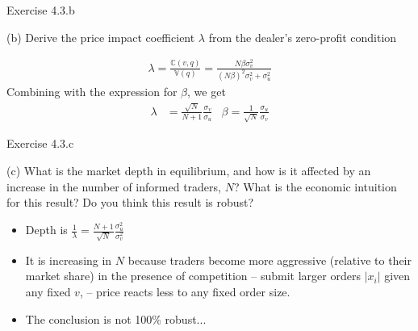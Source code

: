\documentclass[english,10pt
,handout
,aspectratio=169
]{beamer}
\begin{document}
\begin{frame}{Exercise 4.3.b}
	\begin{exampleblock}{}
		(b) Derive the price impact coefficient $\lambda$ from the dealer's zero-profit condition
	\end{exampleblock}

	\pause
	
	\begin{align*}
		\lambda = \frac{\mathbb{C}(v,q)}{\mathbb{V}(q)} = \frac{N \beta \sigma^2_v}{(N \beta)^2 \sigma^2_v + \sigma^2_u}	
	\end{align*}
	Combining with the expression for $\beta$, we get
	\begin{align*}
		\lambda &= \frac{\sqrt{N}}{N+1} \frac{\sigma_v}{\sigma_u} 
		&
		\beta = \frac{1}{\sqrt{N}} \frac{\sigma_u}{\sigma_v}
	\end{align*}
\end{frame}


\begin{frame}{Exercise 4.3.c}
	\begin{exampleblock}{}
		(c) What is the market depth in equilibrium, and how is it affected by an increase in the number of informed traders, $N$? What is the economic intuition for this result?
		Do you think this result is robust?
	\end{exampleblock}
	
	\pause
	
	\begin{itemize}
		\item Depth is $\frac{1}{\lambda} = \frac{N+1}{\sqrt{N}} \frac{\sigma^2_u}{\sigma^2_v} $
		\item It is increasing in $N$ because traders become more aggressive (relative to their market share) in the presence of competition -- submit larger orders $|x_i|$ given any fixed $v$, -- price reacts less to any fixed order size.
		\item The conclusion is not 100\% robust...
	\end{itemize}
\end{frame}


\end{document}
